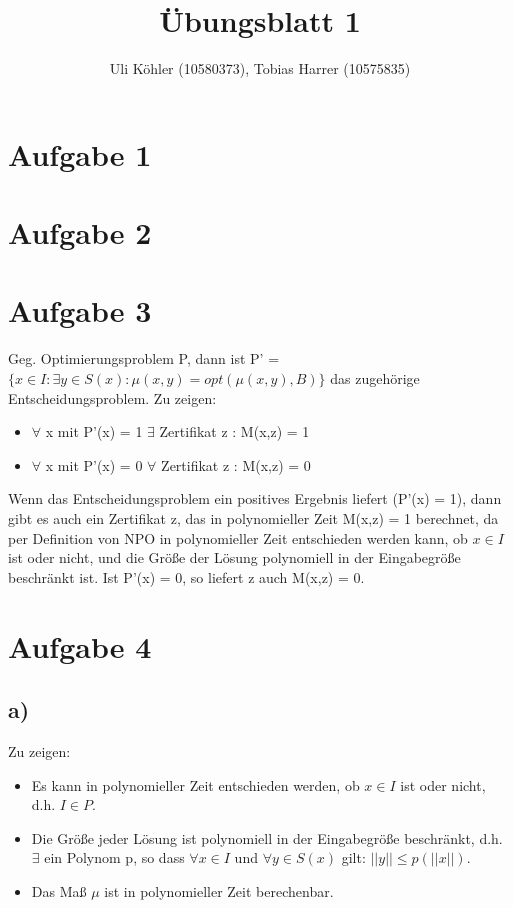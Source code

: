 \documentclass[a4paper,10pt,oneside,leqno]{scrartcl}
\title{Übungsblatt 1}
\author{Uli Köhler (10580373), Tobias Harrer (10575835)}
\begin{document}
\maketitle
\section*{Aufgabe 1}%

\section*{Aufgabe 2}%

\section*{Aufgabe 3}%
Geg. Optimierungsproblem P, dann ist P' = $\{x \in I : \exists y \in S(x) : \mu(x, y) = opt(\mu(x, y), B)\}$ das zugehörige Entscheidungsproblem. \newline
Zu zeigen: \begin{itemize}
     \item $\forall$ x mit P'(x) = 1 $\exists$ Zertifikat z : M(x,z) = 1
     \item $\forall$ x mit P'(x) = 0 $\forall$ Zertifikat z : M(x,z) = 0
    \end{itemize}
    
Wenn das Entscheidungsproblem ein positives Ergebnis liefert (P'(x) = 1), dann gibt es auch ein Zertifikat z, das in polynomieller Zeit M(x,z) = 1
berechnet, da per Definition von NPO in polynomieller Zeit entschieden werden kann, ob $x \in I$ ist oder nicht, und die Größe der Lösung
polynomiell in der Eingabegröße beschränkt ist. Ist P'(x) = 0, so liefert z auch M(x,z) = 0.
\section*{Aufgabe 4}%
\subsection*{a)}
Zu zeigen: \begin{itemize}
            \item  Es kann in polynomieller Zeit entschieden werden, ob $x \in I$ ist oder nicht, d.h. $I \in P$.
	    \item Die Größe jeder Lösung ist polynomiell in der Eingabegröße beschränkt, d.h. $\exists$ ein Polynom p, so dass $\forall x \in I$
	    und $\forall y \in S(x)$ gilt: $||y|| \leq p(||x||)$.
	    \item Das Maß $\mu$ ist in polynomieller Zeit berechenbar.
           \end{itemize}

\end{document}
